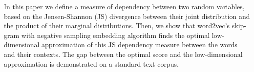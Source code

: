 In this paper we define a measure of dependency between two random variables, based on the Jensen-Shannon (JS) divergence between their joint distribution and the product of their marginal distributions. Then, we show that word2vec's skip-gram with negative sampling embedding algorithm finds the optimal low-dimensional approximation of this JS dependency measure between the words and their contexts. The gap between the optimal score and the low-dimensional approximation is demonstrated on a standard text corpus.
